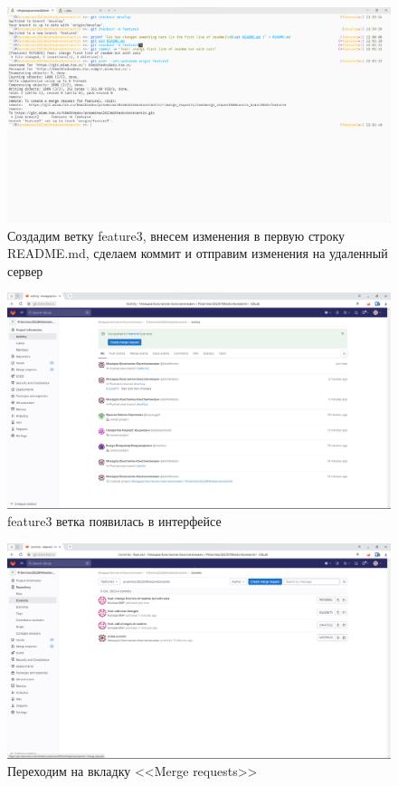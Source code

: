 \documentclass[a4paper]{article}
\begin{document}
  \begin{figure}[H]
    \centering
    \includegraphics[width=\textwidth]{1_ (26)}
    \caption{Создадим ветку feature3, внесем изменения в первую строку README.md, сделаем коммит и отправим изменения на удаленный сервер}
  \end{figure}

  \begin{figure}[H]
    \centering
    \includegraphics[width=\textwidth]{1_ (25)}
    \caption{feature3 ветка появилась в интерфейсе}
  \end{figure}

  \begin{figure}[H]
    \centering
    \includegraphics[width=\textwidth]{1_ (24)}
    \caption{Переходим на вкладку <<Merge requests>>}
  \end{figure}
\end{document}
